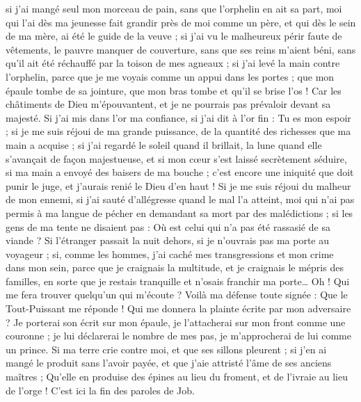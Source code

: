 \begin{multicols}{2}
si j'ai mangé seul mon morceau de pain, sans que l'orphelin en ait sa part,
moi qui l'ai dès ma jeunesse fait grandir près de moi comme un père, et qui dès le sein de ma mère, ai été le guide de la veuve ;
si j'ai vu le malheureux périr faute de vêtements, le pauvre manquer de couverture,
sans que ses reins m'aient béni, sans qu'il ait été réchauffé par la toison de mes agneaux ;
si j'ai levé la main contre l'orphelin, parce que je me voyais comme un appui dans les portes ;
que mon épaule tombe de sa jointure, que mon bras tombe et qu'il se brise l'os !
Car les châtiments de Dieu m'épouvantent, et je ne pourrais pas prévaloir devant sa majesté.
Si j'ai mis dans l'or ma confiance, si j'ai dit à l'or fin : Tu es mon espoir ;
si je me suis réjoui de ma grande puissance, de la quantité des richesses que ma main a acquise ;
si j'ai regardé le soleil quand il brillait, la lune quand elle s'avançait de façon majestueuse,
et si mon cœur s'est laissé secrètement séduire, si ma main a envoyé des baisers de ma bouche ;
c'est encore une iniquité que doit punir le juge, et j'aurais renié le Dieu d'en haut !
Si je me suis réjoui du malheur de mon ennemi, si j'ai sauté d'allégresse quand le mal l'a atteint,
moi qui n'ai pas permis à ma langue de pécher en demandant sa mort par des malédictions ;
si les gens de ma tente ne disaient pas : Où est celui qui n'a pas été rassasié de sa viande ?
Si l'étranger passait la nuit dehors, si je n'ouvrais pas ma porte au voyageur ;
si, comme les hommes, j'ai caché mes transgressions et mon crime dans mon sein,
parce que je craignais la multitude, et je craignais le mépris des familles, en sorte que je restais tranquille et n'osais franchir ma porte…
Oh ! Qui me fera trouver quelqu'un qui m'écoute ? Voilà ma défense toute signée : Que le Tout-Puissant me réponde ! Qui me donnera la plainte écrite par mon adversaire ?
Je porterai son écrit sur mon épaule, je l'attacherai sur mon front comme une couronne ;
je lui déclarerai le nombre de mes pas, je m'approcherai de lui comme un prince.
Si ma terre crie contre moi, et que ses sillons pleurent ;
si j'en ai mangé le produit sans l'avoir payée, et que j'aie attristé l'âme de ses anciens maîtres ;
Qu'elle en produise des épines au lieu du froment, et de l'ivraie au lieu de l'orge ! C'est ici la fin des paroles de Job.

\end{multicols}
